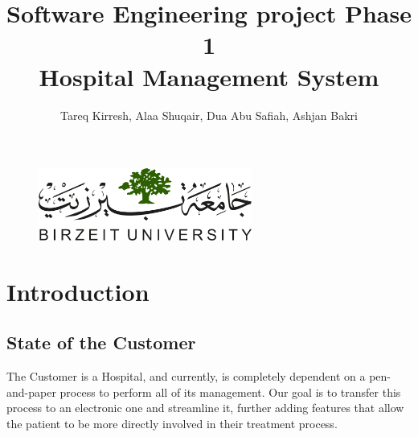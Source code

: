 \documentclass[14pt]{article}
\title{Software Engineering project Phase 1\\Hospital Management System}
\author{Tareq Kirresh, Alaa Shuqair, Dua Abu Safiah, Ashjan Bakri}
\begin{document}
\begin{figure}[t!]
\centering
  \includegraphics[width=7cm]{LOGO.png}
\end{figure}
\maketitle
\newpage
\tableofcontents 
\newpage 
\section{Introduction}
\subsection{State of the Customer}
The Customer is a Hospital, and currently, is completely dependent on a pen-and-paper process to perform all of its management. Our goal
is to transfer this process to an electronic one and streamline it, further adding features that allow the patient to be more 
directly involved in their treatment process. 
\end{document}
